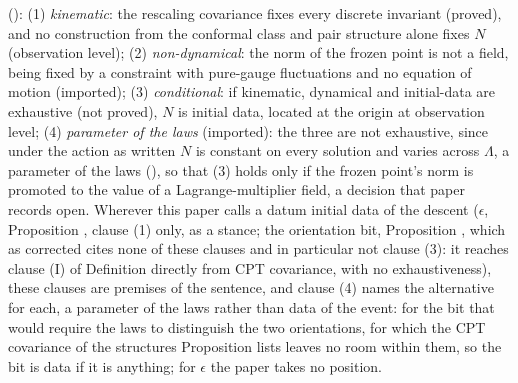 \cite[Prop.~7.6]{ButlerT12} (): (1) \emph{kinematic}: the rescaling covariance fixes every discrete invariant (proved), and no construction from the conformal class and pair structure alone fixes $N$ (observation level); (2) \emph{non-dynamical}: the norm of the frozen point is not a field, being fixed by a constraint with pure-gauge fluctuations and no equation of motion (imported); (3) \emph{conditional}: if kinematic, dynamical and initial-data are exhaustive (not proved), $N$ is initial data, located at the origin at observation level; (4) \emph{parameter of the laws} (imported): the three are not exhaustive, since under the action as written $N$ is constant on every solution and varies across $\Lambda$, a parameter of the laws \cite[Prop.~5.8]{ButlerT10} (), so that (3) holds only if the frozen point's norm is promoted to the value of a Lagrange-multiplier field, a decision that paper records open. Wherever this paper calls a datum initial data of the descent ($\epsilon$, Proposition , clause (1) only, as a stance; the orientation bit, Proposition , which as corrected cites none of these clauses and in particular not clause (3): it reaches clause (I) of Definition  directly from CPT covariance, with no exhaustiveness), these clauses are premises of the sentence, and clause (4) names the alternative for each, a parameter of the laws rather than data of the event: for the bit that would require the laws to distinguish the two orientations, for which the CPT covariance of the structures Proposition  lists leaves no room within them, so the bit is data if it is anything; for $\epsilon$ the paper takes no position.
